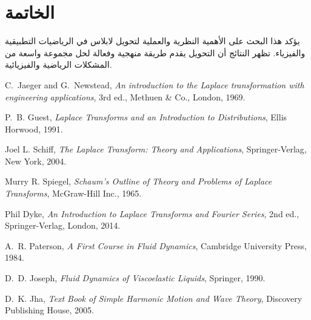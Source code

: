 \documentclass{arabicClass}
\begin{document}
	\chapter*{الخاتمة}
	يؤكد هذا البحث على الأهمية النظرية والعملية لتحويل لابلاس في الرياضيات التطبيقية والفيزياء. تظهر النتائج أن التحويل يقدم طريقة منهجية وفعالة لحل مجموعة واسعة من المشكلات الرياضية والفيزيائية.
	\begin{thebibliography}{9}
		
		\begin{english}
		C.~Jaeger and G.~Newstead,
		\textit{An introduction to the Laplace transformation with engineering applications}, 
		3rd ed., Methuen \& Co., London, 1969.
		
		P.~B. Guest,
		\textit{Laplace Transforms and an Introduction to Distributions}, 
		Ellis Horwood, 1991.
		
		Joel L. Schiff,
		\textit{The Laplace Transform: Theory and Applications}, 
		Springer-Verlag, New York, 2004.
		
		Murry R. Spiegel,
		\textit{Schaum's Outline of Theory and Problems of Laplace Transforms}, 
		McGraw-Hill Inc., 1965.
		
		Phil Dyke,
		\textit{An Introduction to Laplace Transforms and Fourier Series}, 
		2nd ed., Springer-Verlag, London, 2014.
		
		A.~R. Paterson,
		\textit{A First Course in Fluid Dynamics},
		Cambridge University Press, 1984.
		
		D.~D. Joseph,
		\textit{Fluid Dynamics of Viscoelastic Liquids},
		Springer, 1990.
		
		D.~K. Jha,
		\textit{Text Book of Simple Harmonic Motion and Wave Theory},
		Discovery Publishing House, 2005.
		\end{english}
		
	\end{thebibliography}
	
\end{document}
